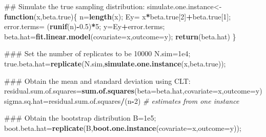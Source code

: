 \documentclass[12pt,]{book}
\newenvironment{Shaded}{\begin{snugshade}}{\end{snugshade}}
\newcommand{\KeywordTok}[1]{\textcolor[rgb]{0.13,0.29,0.53}{\textbf{#1}}}
\newcommand{\DataTypeTok}[1]{\textcolor[rgb]{0.13,0.29,0.53}{#1}}
\newcommand{\DecValTok}[1]{\textcolor[rgb]{0.00,0.00,0.81}{#1}}
\newcommand{\FloatTok}[1]{\textcolor[rgb]{0.00,0.00,0.81}{#1}}
\newcommand{\StringTok}[1]{\textcolor[rgb]{0.31,0.60,0.02}{#1}}
\newcommand{\CommentTok}[1]{\textcolor[rgb]{0.56,0.35,0.01}{\textit{#1}}}
\newcommand{\ControlFlowTok}[1]{\textcolor[rgb]{0.13,0.29,0.53}{\textbf{#1}}}
\newcommand{\OperatorTok}[1]{\textcolor[rgb]{0.81,0.36,0.00}{\textbf{#1}}}
\newcommand{\NormalTok}[1]{#1}
\begin{document}
\begin{Shaded}
\begin{Highlighting}[]
\NormalTok{## Simulate the true sampling distribution:}
\NormalTok{simulate.one.instance<-}\ControlFlowTok{function}\NormalTok{(x,beta.true)\{}
\NormalTok{  n=}\KeywordTok{length}\NormalTok{(x);}
\NormalTok{  Ey=}\StringTok{ }\NormalTok{x}\OperatorTok{*}\NormalTok{beta.true[}\DecValTok{2}\NormalTok{]}\OperatorTok{+}\NormalTok{beta.true[}\DecValTok{1}\NormalTok{];}
\NormalTok{  error.terms=}\StringTok{ }\NormalTok{(}\KeywordTok{runif}\NormalTok{(n)}\OperatorTok{-}\FloatTok{0.5}\NormalTok{)}\OperatorTok{*}\DecValTok{5}\NormalTok{;}
\NormalTok{  y=Ey}\OperatorTok{+}\NormalTok{error.terms;}
\NormalTok{  beta.hat=}\KeywordTok{fit.linear.model}\NormalTok{(}\DataTypeTok{covariate=}\NormalTok{x,}\DataTypeTok{outcome=}\NormalTok{y);}
  \KeywordTok{return}\NormalTok{(beta.hat)}
\NormalTok{\}}

\NormalTok{### Set the number of replicates to be 10000}
\NormalTok{N.sim=}\FloatTok{1e4}\NormalTok{;}
\NormalTok{true.beta.hat=}\KeywordTok{replicate}\NormalTok{(N.sim,}\KeywordTok{simulate.one.instance}\NormalTok{(x,beta.true));}

\NormalTok{### Obtain the mean and standard deviation using CLT:}
\NormalTok{residual.sum.of.squares=}\KeywordTok{sum.of.squares}\NormalTok{(}\DataTypeTok{beta=}\NormalTok{beta.hat,}\DataTypeTok{covariate=}\NormalTok{x,}\DataTypeTok{outcome=}\NormalTok{y)}
\NormalTok{sigma.sq.hat=residual.sum.of.squares}\OperatorTok{/}\NormalTok{(n}\OperatorTok{-}\DecValTok{2}\NormalTok{) }\CommentTok{# estimates from one instance}

  
\NormalTok{### Obtain the bootstrap distribution }
\NormalTok{B=}\FloatTok{1e5}\NormalTok{;}
\NormalTok{boot.beta.hat=}\KeywordTok{replicate}\NormalTok{(B,}\KeywordTok{boot.one.instance}\NormalTok{(}\DataTypeTok{covariate=}\NormalTok{x,}\DataTypeTok{outcome=}\NormalTok{y));}
\end{Highlighting}
\end{Shaded}
\end{document}
